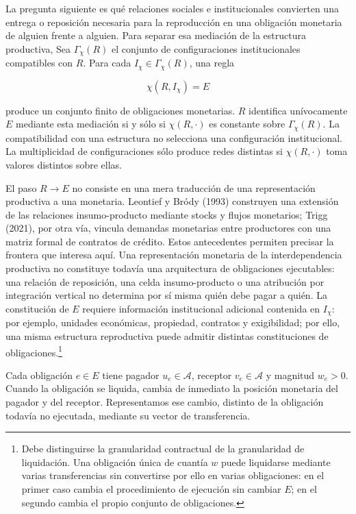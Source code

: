 \documentclass[10pt,a5paper,twoside]{article}
\begin{document}
La pregunta siguiente es qué relaciones sociales e institucionales convierten una
entrega o reposición necesaria para la reproducción en una obligación monetaria de
alguien frente a alguien. Para separar esa mediación de la estructura productiva, 
Sea \(\Gamma_\chi(R)\) el conjunto de configuraciones institucionales
compatibles con \(R\). Para cada \(I_\chi\in\Gamma_\chi(R)\), una regla

\[
\chi(R,I_\chi)=E
\]

produce un conjunto finito de obligaciones monetarias. \(R\) identifica
unívocamente \(E\) mediante esta mediación si y sólo si
\(\chi(R,\cdot)\) es constante sobre \(\Gamma_\chi(R)\). La compatibilidad con una estructura no selecciona una configuración
institucional. La multiplicidad de configuraciones sólo produce redes
distintas si \(\chi(R,\cdot)\) toma valores distintos sobre ellas.

El paso \(R\to E\) no consiste en una mera traducción de una
representación productiva a una monetaria. Leontief y Bródy (1993) construyen una extensión de las
relaciones insumo-producto mediante stocks y flujos monetarios; Trigg (2021),
por otra vía, vincula demandas monetarias entre productores con una matriz
formal de contratos de crédito. Estos antecedentes permiten precisar la frontera que interesa aquí. Una
representación monetaria de la interdependencia productiva no constituye
todavía una arquitectura de obligaciones ejecutables: una relación de
reposición, una celda insumo-producto o una atribución por integración
vertical no determina por sí misma quién debe pagar a quién. La constitución de \(E\) requiere información institucional adicional
contenida en \(I_\chi\): por ejemplo, unidades económicas, propiedad,
contratos y exigibilidad; por ello, una misma estructura reproductiva puede
admitir distintas constituciones de obligaciones.\footnote{Debe distinguirse la
  granularidad contractual de la granularidad de liquidación. Una obligación única de cuantía \(w\) puede liquidarse mediante varias
  transferencias sin convertirse por ello en varias obligaciones: en el
  primer caso cambia el procedimiento de ejecución sin cambiar \(E\); en
  el segundo cambia el propio conjunto de obligaciones.}

Cada obligación \(e\in E\) tiene pagador \(u_e\in\mathcal A\), receptor
\(v_e\in\mathcal A\) y magnitud \(w_e>0\). Cuando la obligación se liquida, cambia de inmediato la posición monetaria del
pagador y del receptor. Representamos ese cambio, distinto de la obligación todavía no
ejecutada, mediante su vector de transferencia.
\end{document}
